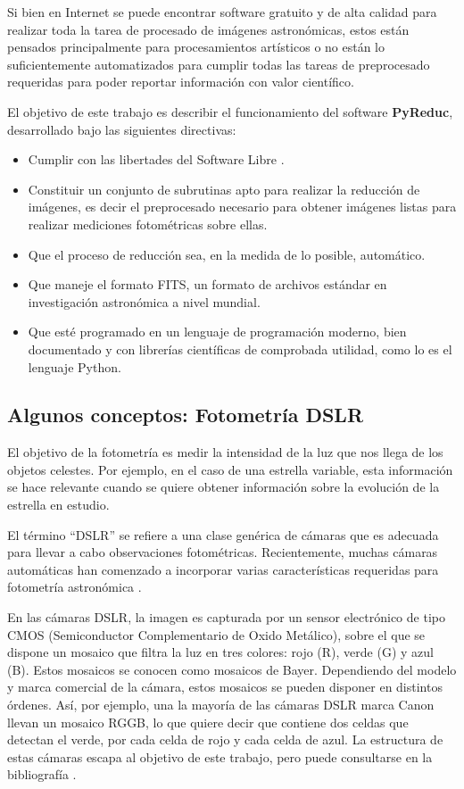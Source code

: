 \documentclass[a4paper, 12pt]{article}
\begin{document}
Si bien en Internet se puede encontrar software gratuito y de  alta calidad para realizar toda la tarea de procesado de imágenes astronómicas, estos están pensados principalmente para procesamientos artísticos o no están lo suficientemente automatizados para cumplir todas las tareas de preprocesado requeridas para poder reportar información con valor científico.

El objetivo de este trabajo es describir el funcionamiento del software \textbf{PyReduc}, desarrollado bajo las siguientes directivas:
\begin{itemize}
\item Cumplir con las libertades del Software Libre \cite{fsf}.
\item Constituir un conjunto de subrutinas  apto para realizar la reducción de imágenes, es decir el preprocesado necesario para obtener imágenes listas para realizar mediciones fotométricas sobre ellas.
\item Que el proceso de reducción sea, en la medida de lo posible, automático.
\item Que maneje el formato FITS, un formato de archivos estándar en investigación astronómica a nivel mundial. 
\item Que esté programado en un lenguaje de programación moderno, bien documentado y con librerías científicas de comprobada utilidad, como lo es el lenguaje Python.
\end{itemize}

\subsection{Algunos conceptos: Fotometría DSLR}
El objetivo de la fotometría es medir la intensidad de la luz que nos llega de los objetos celestes. Por ejemplo, en el caso de una estrella variable, esta información se hace relevante cuando se quiere obtener información sobre la evolución de la estrella en estudio.

El término ``DSLR''  se refiere a una clase genérica de cámaras
que es adecuada para llevar a cabo observaciones fotométricas. Recientemente, muchas cámaras
automáticas han comenzado a incorporar varias características requeridas para fotometría astronómica \cite{aavso}. 

En las cámaras DSLR, la imagen es capturada por un sensor electrónico de tipo CMOS (Semiconductor Complementario
de Oxido Metálico), sobre el que  se dispone un mosaico que filtra la luz en tres colores: rojo (R), verde (G) y azul (B). Estos mosaicos se conocen como mosaicos de Bayer.
Dependiendo del modelo y marca comercial de la cámara, estos mosaicos se pueden disponer en distintos órdenes. Así, por ejemplo, una la mayoría de las cámaras DSLR marca {\sf Canon} llevan un mosaico RGGB, lo que quiere decir que contiene dos celdas que detectan el verde, por cada celda de rojo y cada celda de azul. La estructura de estas cámaras escapa al objetivo de este trabajo, pero puede consultarse en la bibliografía \cite{aavso}.
\end{document}
